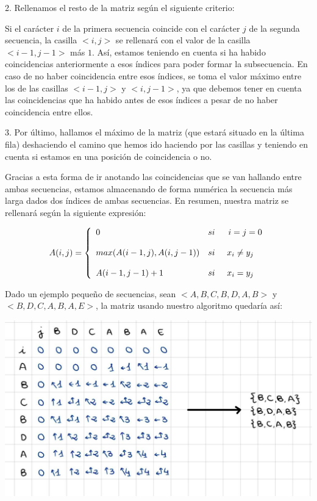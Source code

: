 \documentclass[10pt,a4paper]{article}
\begin{document}
\begin{itemize}
	2. Rellenamos el resto de la matriz según el siguiente criterio:
	
	Si el carácter $i$ de la primera secuencia coincide con el carácter $j$ de la segunda secuencia, la casilla $<i,j>$ se rellenará con el valor de la casilla $<i-1,j-1>$ más $1$. Así, estamos teniendo en cuenta si ha habido coincidencias anteriormente a esos índices para poder formar la subsecuencia. En caso de no haber coincidencia entre esos índices, se toma el valor máximo entre los de las casillas $<i-1,j>$ y $<i,j-1>$, ya que debemos tener en cuenta las coincidencias que ha habido antes de esos índices a pesar de no haber coincidencia entre ellos.
	
	3. Por último, hallamos el máximo de la matriz (que estará situado en la última fila) deshaciendo el camino que hemos ido haciendo por las casillas y teniendo en cuenta si estamos en una posición de coincidencia o no.
	
	Gracias a esta forma de ir anotando las coincidencias que se van hallando entre ambas secuencias, estamos almacenando de forma numérica la secuencia más larga dados dos índices de ambas secuencias. En resumen, nuestra matriz se rellenará según la siguiente expresión:
	
	\[
	A(i,j)= \left\{ \begin{array}{lcc}
		0 &   si  &  \hspace{0.2cm} i=j=0 \\
		\\ max(A(i-1,j),A(i,j-1)) &  si  & x_i \neq y_j \hspace{0.2cm}\\
		\\ A(i-1,j-1) + 1 & si & x_i = y_j \hspace{0.2cm}
	\end{array}
	\right.
	\]
	
	Dado un ejemplo pequeño de secuencias, sean $<A,B,C,B,D,A,B>$ y $<B,D,C,A,B,A,E>$, la matriz usando nuestro algoritmo quedaría así:
	
	\begin{center}
		\includegraphics[scale=0.23]{./Ejemplo.png}
	\end{center}
	

\end{itemize}
\end{document}
